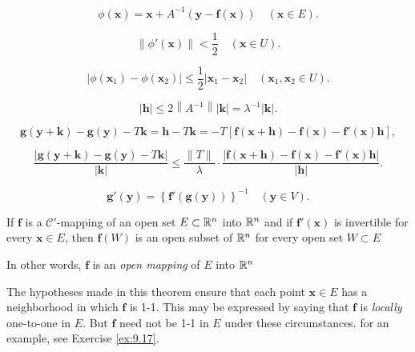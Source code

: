 \begin{equation}
    \label{eq:9.48}
    \phi(\mathbf{x}) = \mathbf{x} + A^{-1} (\mathbf{y-f(x)})
    \quad 
    (\mathbf{x} \in E).
\end{equation}


\begin{equation}
    \label{eq:9.49}
    \left\| \phi'(\mathbf{x}) \right\| < \frac{1}{2}
    \quad 
    (\mathbf{x} \in U).
\end{equation}

\begin{equation}
    \label{eq:9.50}
    \left| 
        \phi(\mathbf{x}_1)-
        \phi(\mathbf{x}_2)
     \right| \leq 
     \frac{1}{2}
     \left| \mathbf{x}_1 - \mathbf{x}_2 \right| 
     \quad 
     (\mathbf{x}_1, \mathbf{x}_2 \in U).
\end{equation}


\begin{equation}
    \label{eq:9.51}
    \left| \mathbf{h} \right| \leq
    2 \left\| A^{-1} \right\| \left| \mathbf{k} \right| =
    \lambda^{-1} \left| \mathbf{k} \right| .
\end{equation}

\begin{equation*}
    \mathbf{g(y+k)-g(y)}-T\mathbf{k} =
    \mathbf{h} - T\mathbf{k} =
    -T\left[ 
        \mathbf{f(x+h)-f(x)-f'(x)h}
     \right],
\end{equation*}

\begin{equation*}
    \frac{|\mathbf{g(y+k)-g(y)}-T\mathbf{k}|}{|\mathbf{k}|} \leq
    \frac{\|T\|}{\lambda}\cdot \frac{|\mathbf{f(x+h)-f(x)-f'(x)h}|}{|\mathbf{h}|}.
\end{equation*}


\begin{equation}
    \label{eq:9.52}
    \mathbf{g'(y)} = 
    \left\{ \mathbf{f'(g(y))} \right\}^{-1}
    \quad 
    (\mathbf{y} \in V).
\end{equation}


\begin{thm}
    \label{thm:9.25}
    If $\mathbf{f}$ is a $\mathscr{C}'$-mapping of an open set $E \subset {\protect\mathbb R}^n$ into ${\protect\mathbb R}^n$ 
    and if $\mathbf{f'(x)}$ is invertible for every $\mathbf{x} \in E$, 
    then $\mathbf{f}(W)$ is an open subset of ${\protect\mathbb R}^n$ for every open set
    $W \subset E$
\end{thm}

In other words, $\mathbf{f}$ is an \emph{open mapping} of $E$ into ${\protect\mathbb R}^n$

The hypotheses made in this theorem ensure that each point $\mathbf{x} \in E$ has a
neighborhood in which $\mathbf{f}$ is 1-1. 
This may be expressed by saying that $\mathbf{f}$ is
\emph{locally} one-to-one in $E$. 
But $\mathbf{f}$ need not be 1-1 in $E$ under these circumstances.
for an example, see Exercise \ref{ex:9.17}.